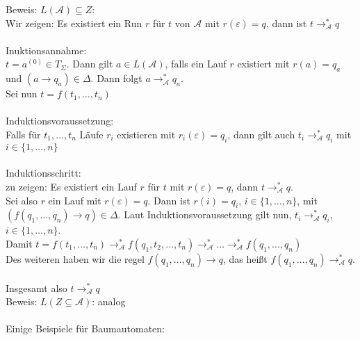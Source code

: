 \documentclass[titlepage]{article}
\begin{document}
Beweis: \glqq$L(\mathcal{A}) \subseteq Z$\grqq:\\

Wir zeigen: Es existiert ein Run $r$ f\"ur $t$ von $\mathcal{A}$ mit 
$r(\varepsilon) = q$, dann ist $t \rightarrow ^\ast_{\mathcal{A}} q$\\ \\
Inuktionsannahme:\\
$t=a^{(0)} \in T_{\Sigma}$. Dann gilt $a \in L({\mathcal{A}})$, falls ein Lauf $r$ 
existiert mit $r(a) = q_a$ und $(a \rightarrow q_a) \in \Delta$. 
Dann folgt $a \rightarrow^\ast_{{\mathcal{A}}} q_a$.\\
Sei nun $t=f(t_1, \dots, t_n)$\\ \\

Induktionsvoraussetzung:\\
Falls f\"ur $t_1, \dots , t_n$ L\"aufe $r_i$ existieren mit $r_i(\varepsilon) = q_i$, 
dann gilt auch $t_i \rightarrow ^\ast_{\mathcal{A}} q_i$ mit $i\in \{1, \dots , n\}$\\ \\

Induktionsschritt:\\
zu zeigen: Es existiert ein Lauf $r$ f\"ur $t$ mit $r(\varepsilon) = q$, dann 
$t \rightarrow ^\ast_\mathcal{A} q$.\\
Sei also $r$ ein Lauf mit $r(\varepsilon) = q$. Dann ist $r(i) = q_i$, 
$i \in \{1, \dots, n\}$, mit
$(f(q_1, \dots, q_n) \rightarrow q) \in \Delta$. Laut Induktionsvoraussetzung gilt nun,
$t_i \rightarrow ^\ast_\mathcal{A} q_i$, $i \in \{1, \dots, n\}$.\\
Damit $t = f(t_1, \dots, t_n) 
\rightarrow ^\ast_\mathcal{A} f(q_1, t_2, \dots, t_n)
\rightarrow ^\ast_\mathcal{A} \dots
\rightarrow ^\ast_\mathcal{A} f(q_1, \dots, q_n)$\\
Des weiteren haben wir die regel $f(q_1, \dots, q_n) \rightarrow q$, das hei\ss t 
$f(q_1, \dots, q_n) \rightarrow ^\ast_\mathcal{A} q$.\\ \\

Insgesamt also $t \rightarrow ^\ast_\mathcal{A} q$ \\

Beweis: \glqq$L(Z \subseteq \mathcal{A})$\grqq: analog\\ \\

Einige Beispiele f\"ur Baumautomaten:\\
\end{document}
